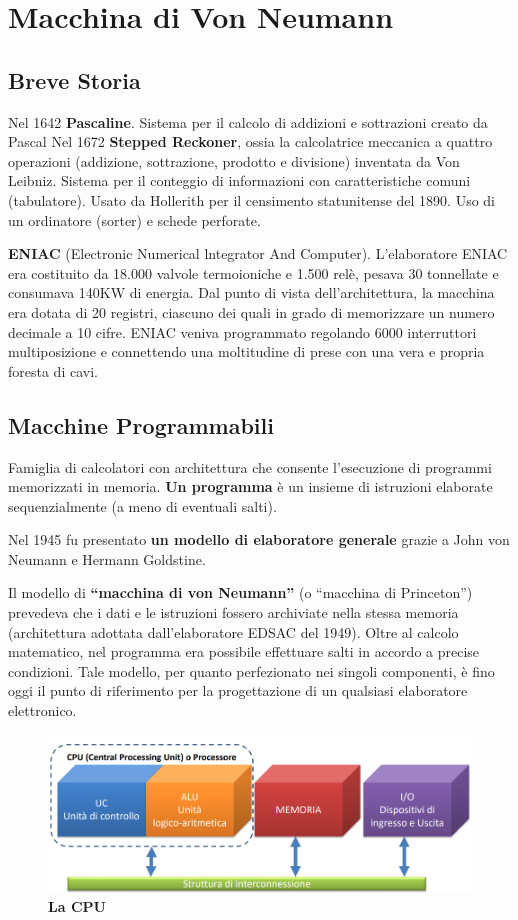 \documentclass[12pt]{article}
\begin{document}
\newpage
\section{Macchina di Von Neumann}
\subsection{Breve Storia}
Nel 1642 \textbf{Pascaline}. Sistema per il calcolo di addizioni e sottrazioni creato da Pascal
Nel 1672 \textbf{Stepped Reckoner}, ossia la calcolatrice meccanica a quattro operazioni (addizione, sottrazione, prodotto e divisione) inventata da Von Leibniz. Sistema per il conteggio di informazioni con caratteristiche comuni (tabulatore). Usato da Hollerith per il censimento statunitense del 1890. Uso di un ordinatore (sorter) e schede perforate.\par\medskip\noindent
\textbf{ENIAC} (Electronic Numerical lntegrator And Computer). L’elaboratore ENIAC era costituito da
18.000 valvole termoioniche e 1.500 relè, pesava 30 tonnellate e consumava 140KW di energia. Dal punto di vista dell'architettura, la macchina era dotata di 20 registri, ciascuno dei quali in grado di memorizzare un numero decimale a 10 cifre. ENIAC veniva programmato regolando 6000 interruttori multiposizione e connettendo una moltitudine di prese con una vera e propria foresta di cavi.

\subsection{Macchine Programmabili}
Famiglia di calcolatori con architettura che consente l’esecuzione di programmi memorizzati in memoria. \textbf{Un programma }è un insieme di istruzioni elaborate sequenzialmente (a meno di eventuali salti). \par\medskip\noindent
Nel 1945 fu presentato \textbf{un modello di elaboratore generale} grazie a John von Neumann e Hermann Goldstine. \par\medskip\noindent
Il modello di \textbf{“macchina di von Neumann”} (o “macchina di Princeton”) prevedeva che i dati e le istruzioni fossero archiviate nella stessa memoria (architettura adottata dall’elaboratore EDSAC del 1949). Oltre al calcolo matematico, nel programma era possibile effettuare salti in accordo a precise condizioni. Tale modello, per quanto perfezionato nei singoli componenti, è fino oggi il punto di riferimento per la progettazione di un qualsiasi elaboratore elettronico.
\begin{figure}[h]
    \centering
    \includegraphics[width=0.75\linewidth]{von neumann.png}
    \caption{\textbf{La CPU}}
    \label{fig:enter-label}
\end{figure}
\newpage
\end{document}
